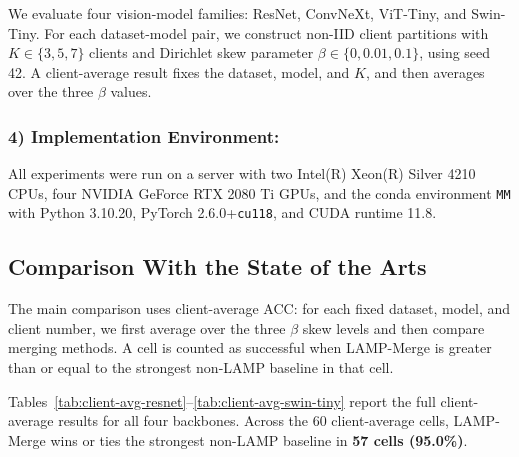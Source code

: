 \documentclass[letterpaper]{article} %
\begin{document}
We evaluate four vision-model families: ResNet, ConvNeXt, ViT-Tiny, and Swin-Tiny\cite{he2016deep,liu2022convnet,dosovitskiy2021image,liu2021swin}. For each dataset-model pair, we construct non-IID client partitions with $K\in\{3,5,7\}$ clients and Dirichlet skew parameter $\beta\in\{0,0.01,0.1\}$, using seed 42\cite{hsu2019measuringeffectsnonidenticaldata}. A client-average result fixes the dataset, model, and $K$, and then averages over the three $\beta$ values.

\subsubsection{4) Implementation Environment:}

All experiments were run on a server with two Intel(R) Xeon(R) Silver 4210 CPUs, four NVIDIA GeForce RTX 2080 Ti GPUs, and the conda environment \texttt{MM} with Python 3.10.20, PyTorch 2.6.0+\texttt{cu118}, and CUDA runtime 11.8.

\subsection{Comparison With the State of the Arts}
The main comparison uses client-average ACC: for each fixed dataset, model, and client number, we first average over the three $\beta$ skew levels and then compare merging methods. A cell is counted as successful when LAMP-Merge is greater than or equal to the strongest non-LAMP baseline in that cell.

Tables~\ref{tab:client-avg-resnet}--\ref{tab:client-avg-swin-tiny} report the full client-average results for all four backbones. Across the 60 client-average cells, LAMP-Merge wins or ties the strongest non-LAMP baseline in \textbf{57 cells (95.0\%)}.
\end{document}
